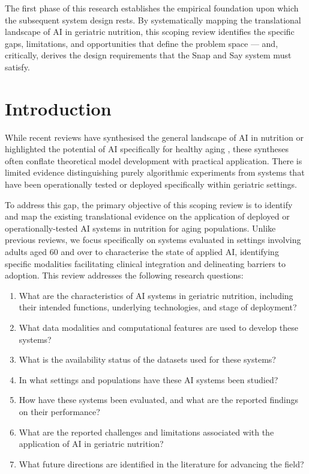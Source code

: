 The first phase of this research establishes the empirical foundation upon which the subsequent system design rests. By systematically mapping the translational landscape of AI in geriatric nutrition, this scoping review identifies the specific gaps, limitations, and opportunities that define the problem space --- and, critically, derives the design requirements that the Snap and Say system must satisfy.

\section{Introduction}

While recent reviews have synthesised the general landscape of AI in nutrition \citep{theodorearmandApplicationsArtificialIntelligence2024} or highlighted the potential of AI specifically for healthy aging \citep{grootswagersArtificialIntelligenceNutrition2025}, these syntheses often conflate theoretical model development with practical application. There is limited evidence distinguishing purely algorithmic experiments from systems that have been operationally tested or deployed specifically within geriatric settings.

To address this gap, the primary objective of this scoping review is to identify and map the existing translational evidence on the application of deployed or operationally-tested AI systems in nutrition for aging populations. Unlike previous reviews, we focus specifically on systems evaluated in settings involving adults aged 60 and over to characterise the state of applied AI, identifying specific modalities facilitating clinical integration and delineating barriers to adoption. This review addresses the following research questions:

\begin{enumerate}
    \item What are the characteristics of AI systems in geriatric nutrition, including their intended functions, underlying technologies, and stage of deployment?
    \item What data modalities and computational features are used to develop these systems?
    \item What is the availability status of the datasets used for these systems?
    \item In what settings and populations have these AI systems been studied?
    \item How have these systems been evaluated, and what are the reported findings on their performance?
    \item What are the reported challenges and limitations associated with the application of AI in geriatric nutrition?
    \item What future directions are identified in the literature for advancing the field?
\end{enumerate}

